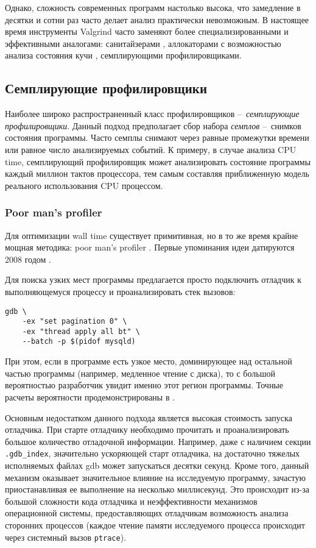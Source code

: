 Однако, сложность современных программ настолько высока, что замедление в десятки и сотни раз
часто делает анализ практически невозможным.
В настоящее время инструменты Valgrind часто заменяют более специализированными и эффективными аналогами:
санитайзерами \cite{sanitizers}, аллокаторами с возможностью анализа состояния кучи \cite{tcmalloc:hp}, семплирующими профилировщиками.

\subsection{Семплирующие профилировщики}
Наиболее широко распространенный класс профилировщиков – \textit{семплирующие профилировщики}.
Данный подход предполагает сбор набора \textit{семплов} – снимков состояния программы.
Часто семплы снимают через равные промежутки времени или равное число анализируемых событий.
К примеру, в случае анализа CPU time, семплирующий профилировщик может анализировать состояние программы каждый миллион тактов процессора,
тем самым составляя приближенную модель реального использования CPU процессом.

\subsubsection{Poor man's profiler}
Для оптимизации wall time существует примитивная, но в то же время крайне мощная методика: poor man's profiler \cite{pmp:site}.
Первые упоминания идеи датируются 2008 годом \cite{pmp:so, pmp:mysqld, pmp:contention}.

Для поиска узких мест программы предлагается просто подключить отладчик к выполняющемуся процессу и проанализировать стек вызовов:
\begin{verbatim}
gdb \
    -ex "set pagination 0" \
    -ex "thread apply all bt" \
    --batch -p $(pidof mysqld)
\end{verbatim}

При этом, если в программе есть узкое место, доминирующее над остальной частью программы (например, медленное чтение с диска), то
с большой вероятностью разработчик увидит именно этот регион программы.
Точные расчеты вероятности продемонстрированы в \cite{pmp:so}.

Основным недостатком данного подхода является высокая стоимость запуска отладчика.
При старте отладчику необходимо прочитать и проанализировать большое количество отладочной информации.
Например, даже с наличием секции \verb!.gdb_index!, значительно ускоряющей старт отладчика, на достаточно тяжелых исполняемых файлах
gdb может запускаться десятки секунд.
Кроме того, данный механизм оказывает значительное влияние на исследуемую программу, зачастую приостанавливая ее выполнение
на несколько миллисекунд. Это происходит из-за большой сложности кода отладчика и неэффективности механизмов операционной системы,
предоставляющих отладчикам возможность анализа сторонних процессов (каждое чтение памяти исследуемого процесса
происходит через системный вызов \verb!ptrace!).

